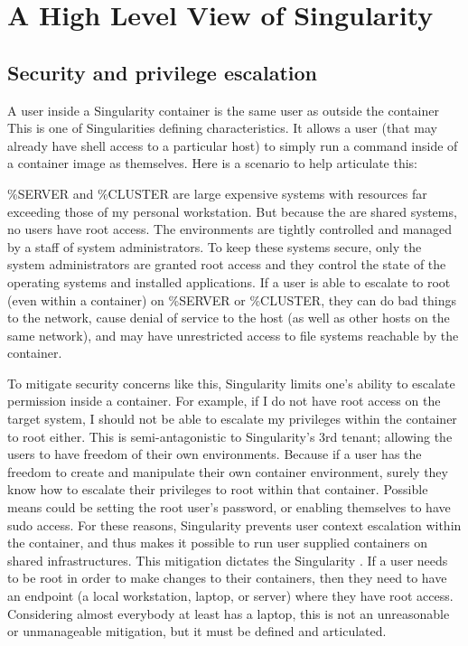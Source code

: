 \documentclass[letterpaper,10pt,english]{sphinxmanual}
\begin{document}
\section{A High Level View of Singularity}
\label{\detokenize{introduction:a-high-level-view-of-singularity}}

\subsection{Security and privilege escalation}
\label{\detokenize{introduction:security-and-privilege-escalation}}
A user inside a Singularity container
is the same user as outside the container
This is one of Singularities defining characteristics. It allows a
user (that may already have shell access to a particular host) to
simply run a command inside of a container image as themselves. Here
is a scenario to help articulate this:

\%SERVER and \%CLUSTER are large expensive systems with resources far
exceeding those of my personal workstation. But because the are
shared systems, no users have root access. The environments are
tightly controlled and managed by a staff of system administrators.
To keep these systems secure, only the system administrators are
granted root access and they control the state of the operating
systems and installed applications. If a user is able to escalate to
root (even within a container) on \%SERVER or \%CLUSTER, they can do
bad things to the network, cause denial of service to the host (as
well as other hosts on the same network), and may have unrestricted
access to file systems reachable by the container.

To mitigate security concerns like this, Singularity limits one’s
ability to escalate permission inside a container. For example, if I
do not have root access on the target system, I should not be able to
escalate my privileges within the container to root either. This is
semi-antagonistic to Singularity’s 3rd tenant; allowing the users to
have freedom of their own environments. Because if a user has the
freedom to create and manipulate their own container environment,
surely they know how to escalate their privileges to root within that
container. Possible means could be setting the root user’s password,
or enabling themselves to have sudo access. For these reasons,
Singularity prevents user context escalation within the container, and
thus makes it possible to run user supplied containers on shared
infrastructures.
This mitigation dictates the Singularity . If a user needs to be root
in order to make changes to their containers, then they need to have
an endpoint (a local workstation, laptop, or server) where they have
root access. Considering almost everybody at least has a laptop, this
is not an unreasonable or unmanageable mitigation, but it must be
defined and articulated.
\end{document}
